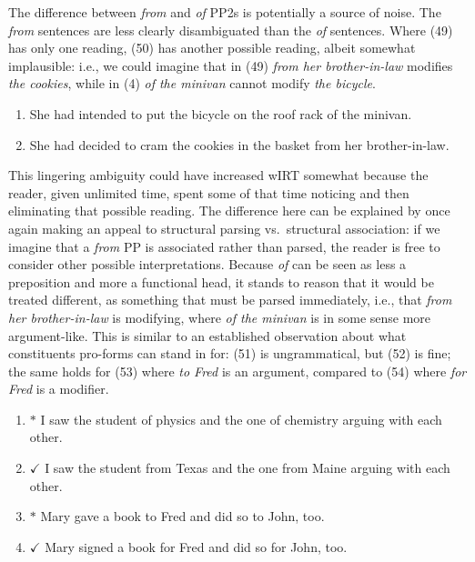 \documentclass[12pt,oneside]{book}
\providecommand{\tightlist}{%
  \setlength{\itemsep}{0pt}\setlength{\parskip}{0pt}}
\begin{document}
The difference between \emph{from} and \emph{of} PP2s is potentially a source of noise. The \emph{from} sentences are less clearly disambiguated than the \emph{of} sentences. Where (49) has only one reading, (50) has another possible reading, albeit somewhat implausible: i.e., we could imagine that in (49) \emph{from her brother-in-law} modifies \emph{the cookies}, while in (4) \emph{of the minivan} cannot modify \emph{the bicycle}.

\begin{enumerate}
\def\labelenumi{(\arabic{enumi})}
\setcounter{enumi}{48}
\tightlist
\item
  She had intended to put the bicycle on the roof rack of the minivan.
\item
  She had decided to cram the cookies in the basket from her brother-in-law.
\end{enumerate}

This lingering ambiguity could have increased wIRT somewhat because the reader, given unlimited time, spent some of that time noticing and then eliminating that possible reading. The difference here can be explained by once again making an appeal to structural parsing vs.~structural association: if we imagine that a \emph{from} PP is associated rather than parsed, the reader is free to consider other possible interpretations. Because \emph{of} can be seen as less a preposition and more a functional head, it stands to reason that it would be treated different, as something that must be parsed immediately, i.e., that \emph{from her brother-in-law} is modifying, where \emph{of the minivan} is in some sense more argument-like. This is similar to an established observation about what constituents pro-forms can stand in for: (51) is ungrammatical, but (52) is fine; the same holds for (53) where \emph{to Fred} is an argument, compared to (54) where \emph{for Fred} is a modifier.

\begin{enumerate}
\def\labelenumi{(\arabic{enumi})}
\setcounter{enumi}{50}
\item
  \(*\) I saw the student of physics and the one of chemistry arguing with each other.
\item
  \(\checkmark\) I saw the student from Texas and the one from Maine arguing with each other.
\item
  \(*\) Mary gave a book to Fred and did so to John, too.
\item
  \(\checkmark\) Mary signed a book for Fred and did so for John, too.
\end{enumerate}
\end{document}
